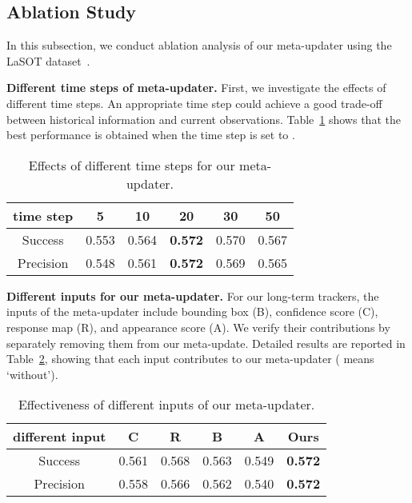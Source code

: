 \documentclass[10pt,twocolumn,letterpaper]{article}
\begin{document}
\subsection{Ablation Study}
\vspace{-2mm}
In this subsection, we conduct ablation analysis of our meta-updater
using the LaSOT dataset~\cite{LaSOT}.

\noindent \textbf{Different time steps of meta-updater.}
First, we investigate the effects of different time steps.
An appropriate time step could achieve a good trade-off between historical information and
current observations.
Table~\ref{tab:dts} shows that the best performance is obtained when the time step is set to
.

\vspace{-3mm}
\begin{table}[h]
\caption{Effects of different time steps for our meta-updater.}
\vspace{-3mm}
\label{tab:dts}
\small
\begin{center}
\begin{tabular}{cccccc}
\hline
time step  & 5     & 10    & 20   & 30    & 50    \\
\hline
Success      & 0.553 & 0.564 & {\color[HTML]{FE0000} \textbf{0.572}} & 0.570 & 0.567 \\
Precision & 0.548 & 0.561 & {\color[HTML]{FE0000} \textbf{0.572}} & 0.569 & 0.565\\
\hline
\end{tabular}
\end{center}
\vspace{-6mm}
\end{table}

\noindent \textbf{Different inputs for our meta-updater.} For our long-term trackers, the inputs of
the meta-updater include bounding box (B), confidence score (C), response map (R), and appearance
score (A). We verify their contributions by separately removing them from our meta-update.
Detailed results are reported in Table~\ref{tab:updater_input}, showing that each input contributes
to our meta-updater ( means `without').

\vspace{-2mm}
\begin{table}[h]
\caption{Effectiveness of different inputs of our meta-updater. }
\vspace{-5mm}
\small
\label{tab:updater_input}
\begin{center}
\begin{tabular}{cccccc}
\hline
different input &  C    &  R    &  B  &  A    & Ours                     \\
 \hline
Success         & 0.561 & 0.568 &0.563 & 0.549 & {\color[HTML]{FE0000} \textbf{0.572}} \\
Precision       & 0.558 & 0.566 &0.562 & 0.540 & {\color[HTML]{FE0000} \textbf{0.572}} \\
\hline
\end{tabular}
\end{center}
\vspace{-6mm}
\end{table}
\end{document}
